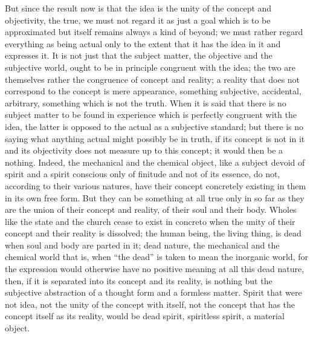 But since the result now is that the idea is
the unity of the concept and objectivity, the true,
we must not regard it as just a goal which is to be approximated
but itself remains always a kind of beyond;
we must rather regard everything as being actual
only to the extent that it has the idea
in it and expresses it.
It is not just that the subject matter,
the objective and the subjective world,
ought to be in principle congruent with the idea;
the two are themselves rather the congruence of concept and reality;
a reality that does not correspond to the concept is mere appearance,
something subjective, accidental, arbitrary, something which is not the truth.
When it is said that there is no subject matter
to be found in experience which is perfectly congruent with the idea,
the latter is opposed to the actual as a subjective standard;
but there is no saying what anything actual
might possibly be in truth, if its concept is not in it
and its objectivity does not measure up to this concept;
it would then be a nothing.
Indeed, the mechanical and the chemical object,
like a subject devoid of spirit
and a spirit conscious only of finitude and not of its essence,
do not, according to their various natures,
have their concept concretely existing in them in
its own free form.
But they can be something at all true only in so far as
they are the union of their concept and reality, of their soul and their body.
Wholes like the state and the church cease to exist in concreto when the
unity of their concept and their reality is dissolved; the human being, the
living thing, is dead when soul and body are parted in it; dead nature, the
mechanical and the chemical world
that is, when “the dead” is taken
to mean the inorganic world,
for the expression would otherwise have no positive meaning at all
this dead nature, then, if it is separated into its
concept and its reality,
is nothing but the subjective abstraction of
a thought form and a formless matter.
Spirit that were not idea,
not the unity of the concept with itself,
not the concept that has the concept itself as its reality,
would be dead spirit, spiritless spirit, a material object.

